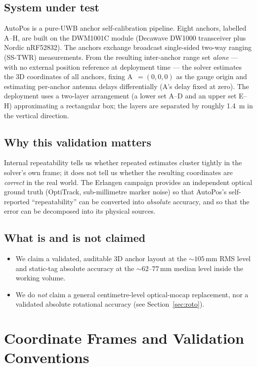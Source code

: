 \documentclass[11pt,a4paper]{article}
\newcommand{\mm}{\,\si{\milli\meter}}
\begin{document}
\subsection{System under test}
AutoPos is a pure-UWB anchor self-calibration pipeline. Eight anchors, labelled A--H, are
built on the DWM1001C module (Decawave DW1000 transceiver plus Nordic nRF52832). The
anchors exchange broadcast single-sided two-way ranging (SS-TWR) measurements. From the
resulting inter-anchor range set \emph{alone} --- with no external position reference at
deployment time --- the solver estimates the 3D coordinates of all anchors, fixing
A~$=(0,0,0)$ as the gauge origin and estimating per-anchor antenna delays differentially
(A's delay fixed at zero). The deployment uses a two-layer arrangement (a lower set
A--D and an upper set E--H) approximating a rectangular box; the layers are separated by
roughly \SI{1.4}{\meter} in the vertical direction.

\subsection{Why this validation matters}
Internal repeatability tells us whether repeated estimates cluster tightly in the solver's
own frame; it does not tell us whether the resulting coordinates are \emph{correct} in the
real world. The Erlangen campaign provides an independent optical ground truth (OptiTrack,
sub-millimetre marker noise) so that AutoPos's self-reported ``repeatability'' can be
converted into \emph{absolute} accuracy, and so that the error can be decomposed into its
physical sources.

\subsection{What is and is not claimed}
\begin{itemize}[leftmargin=1.4em]
  \item We claim a validated, auditable 3D anchor layout at the $\sim\!105\mm$ RMS level
        and static-tag absolute accuracy at the $\sim\!62$--$77\mm$ median level inside the
        working volume.
  \item We do \emph{not} claim a general centimetre-level optical-mocap replacement, nor a
        validated absolute rotational accuracy (see Section~\ref{sec:roto}).
\end{itemize}

\section{Coordinate Frames and Validation Conventions}
\label{sec:conventions}
\end{document}
